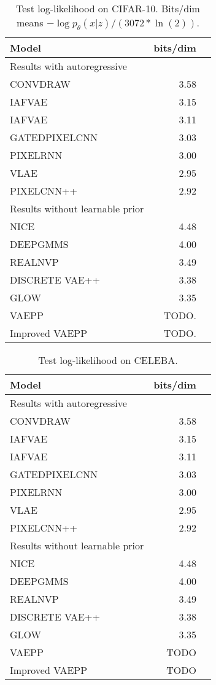 \begin{table}
\centering
\begin{tabular}{lrr}  
\toprule
Model  &  bits/dim \\
\midrule
Results with autoregressive   \\
CONVDRAW         &  3.58      \\
IAFVAE           &  3.15      \\
IAFVAE           &  3.11      \\
GATEDPIXELCNN    &  3.03      \\
PIXELRNN         &  3.00      \\
VLAE             &  2.95      \\
PIXELCNN++       &  2.92      \\
\midrule
Results without learnable prior   \\
NICE             &  4.48      \\
DEEPGMMS         &  4.00      \\
REALNVP          &  3.49      \\
DISCRETE VAE++   &  3.38      \\
GLOW             &  3.35      \\
 VAEPP           &  TODO.     \\
Improved VAEPP   &  TODO.     \\
\bottomrule
\end{tabular}
\caption{Test log-likelihood on CIFAR-10. Bits/dim means $-\log p_\theta(x|z) / (3072 * \ln(2))$.}
\label{tab:cifar-nll}
\end{table}

\begin{table}
\centering
\begin{tabular}{lrr}  
\toprule
Model  &  bits/dim \\
\midrule
Results with autoregressive   \\
CONVDRAW         &  3.58      \\
IAFVAE           &  3.15      \\
IAFVAE           &  3.11      \\
GATEDPIXELCNN    &  3.03      \\
PIXELRNN         &  3.00      \\
VLAE             &  2.95      \\
PIXELCNN++       &  2.92      \\
\midrule
Results without learnable prior   \\
NICE             &  4.48      \\
DEEPGMMS         &  4.00      \\
REALNVP          &  3.49      \\
DISCRETE VAE++   &  3.38      \\
GLOW             &  3.35      \\
VAEPP            &  TODO      \\
Improved VAEPP   &  TODO      \\
\bottomrule
\end{tabular}
\caption{Test log-likelihood on CELEBA.  }
\label{tab:cifar-nll}
\end{table}

